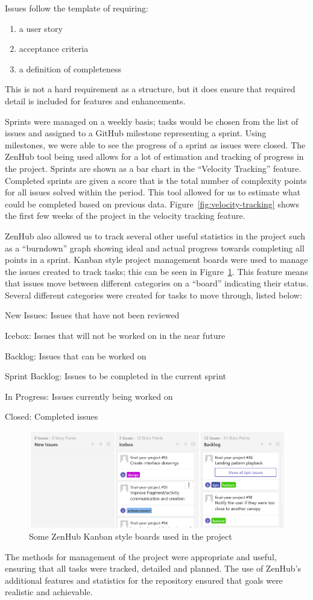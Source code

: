 Issues follow the template of requiring:
\begin{enumerate}[noitemsep]
  \item a user story
  \item acceptance criteria
  \item a definition of completeness
\end{enumerate}
This is not a hard requirement as a structure, but it does ensure that required detail is included for features and enhancements.

Sprints were managed on a weekly basis; tasks would be chosen from the list of issues and assigned to a GitHub milestone representing a sprint. Using milestones, we were able to see the progress of a sprint as issues were closed.
The ZenHub tool being used allows for a lot of estimation and tracking of progress in the project. Sprints are shown as a bar chart in the ``Velocity Tracking'' feature. Completed sprints are given a score that is the total number of complexity points for all issues solved within the period. This tool allowed for us to estimate what could be completed based on previous data. Figure~\ref{fig:velocity-tracking} shows the first few weeks of the project in the velocity tracking feature.

ZenHub also allowed us to track several other useful statistics in the project such as a ``burndown'' graph showing ideal and actual progress towards completing all points in a sprint.
Kanban style project management boards were used to manage the issues created to track tasks; this can be seen in Figure~\ref{fig:kanban-board}. This feature means that issues move between different categories on a ``board'' indicating their status. Several different categories were created for tasks to move through, listed below:
\begin{description}[noitemsep]
  \item New Issues: Issues that have not been reviewed
  \item Icebox: Issues that will not be worked on in the near future
  \item Backlog: Issues that can be worked on
  \item Sprint Backlog: Issues to be completed in the current sprint
  \item In Progress: Issues currently being worked on
  \item Closed: Completed issues
\end{description}

\begin{figure}[ht]
  \centering
  \includegraphics[width=\linewidth]{img/issue-board.png}
  \caption{Some ZenHub Kanban style boards used in the project}\label{fig:kanban-board}
\end{figure}

The methods for management of the project were appropriate and useful, ensuring that all tasks were tracked, detailed and planned. The use of ZenHub's additional features and statistics for the repository ensured that goals were realistic and achievable.
